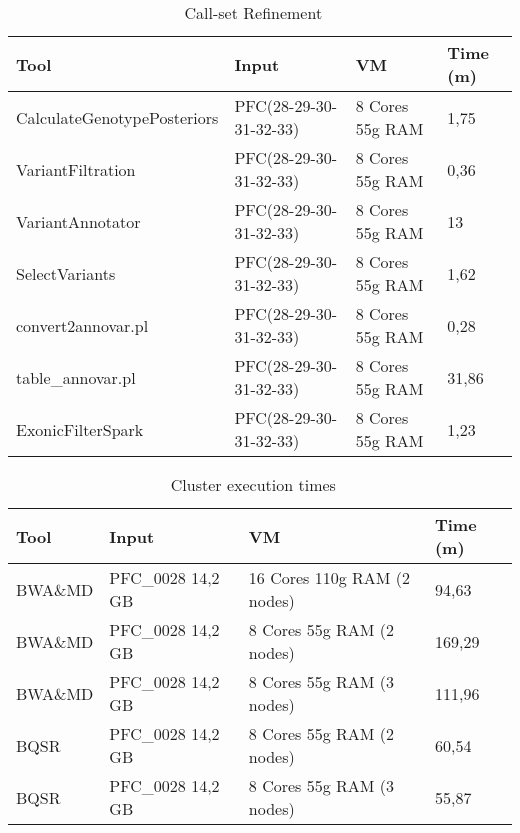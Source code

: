 \begin{table}[h]
	\caption{Call-set Refinement ~\label{cr}}
	\begin{center}
		\begin{tabular}{| m{12em} | m{11em} | m{8em} | m{5em} |}
    		\hline
    		Tool & Input & VM & Time (m) \\ \hline
		    CalculateGenotypePosteriors & PFC(28-29-30-31-32-33) & 8 Cores 55g RAM & 1,75 \\ \hline
			VariantFiltration & PFC(28-29-30-31-32-33) & 8 Cores 55g RAM  & 0,36 \\ \hline
			VariantAnnotator & PFC(28-29-30-31-32-33) & 8 Cores 55g RAM  & 13 \\ \hline
			SelectVariants & PFC(28-29-30-31-32-33) & 8 Cores 55g RAM  & 1,62 \\ \hline
			convert2annovar.pl & PFC(28-29-30-31-32-33) & 8 Cores 55g RAM  & 0,28 \\ \hline
			table\_annovar.pl & PFC(28-29-30-31-32-33) & 8 Cores 55g RAM  & 31,86 \\ \hline
			ExonicFilterSpark & PFC(28-29-30-31-32-33) & 8 Cores 55g RAM  & 1,23 \\ \hline
            
    	\end{tabular}
    \end{center}
\end{table}
\begin{table}[h]
	\caption{Cluster execution times ~\label{cluster}}
	\begin{center}
		\begin{tabular}{| m{5em} | m{9em} | m{13em} | m{3em} |}
    		\hline
    		Tool & Input & VM & Time (m) \\ \hline
			BWA\&MD & PFC\_0028 14,2 GB & 16 Cores 110g RAM (2 nodes) & 94,63 \\ \hline
			BWA\&MD & PFC\_0028 14,2 GB & 8 Cores 55g RAM (2 nodes) & 169,29 \\ \hline
            BWA\&MD & PFC\_0028 14,2 GB & 8 Cores 55g RAM (3 nodes) & 111,96 \\ \hline
            
            BQSR & PFC\_0028 14,2 GB & 8 Cores 55g RAM (2 nodes) & 60,54 \\ \hline
            BQSR & PFC\_0028 14,2 GB & 8 Cores 55g RAM (3 nodes) & 55,87 \\ \hline
    	\end{tabular}
    \end{center}
\end{table}
